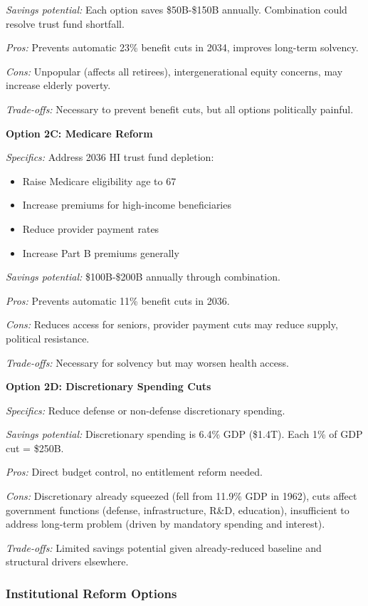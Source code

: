 \documentclass[12pt,letterpaper]{article}
\begin{document}
\textit{Savings potential:} Each option saves \$50B-\$150B annually. Combination could resolve trust fund shortfall.

\textit{Pros:} Prevents automatic 23\% benefit cuts in 2034, improves long-term solvency.

\textit{Cons:} Unpopular (affects all retirees), intergenerational equity concerns, may increase elderly poverty.

\textit{Trade-offs:} Necessary to prevent benefit cuts, but all options politically painful.

\textbf{Option 2C: Medicare Reform}

\textit{Specifics:} Address 2036 HI trust fund depletion:
\begin{itemize}
    \item Raise Medicare eligibility age to 67
    \item Increase premiums for high-income beneficiaries
    \item Reduce provider payment rates
    \item Increase Part B premiums generally
\end{itemize}

\textit{Savings potential:} \$100B-\$200B annually through combination.

\textit{Pros:} Prevents automatic 11\% benefit cuts in 2036.

\textit{Cons:} Reduces access for seniors, provider payment cuts may reduce supply, political resistance.

\textit{Trade-offs:} Necessary for solvency but may worsen health access.

\textbf{Option 2D: Discretionary Spending Cuts}

\textit{Specifics:} Reduce defense or non-defense discretionary spending.

\textit{Savings potential:} Discretionary spending is 6.4\% GDP (\$1.4T). Each 1\% of GDP cut = \$250B.

\textit{Pros:} Direct budget control, no entitlement reform needed.

\textit{Cons:} Discretionary already squeezed (fell from 11.9\% GDP in 1962), cuts affect government functions (defense, infrastructure, R\&D, education), insufficient to address long-term problem (driven by mandatory spending and interest).

\textit{Trade-offs:} Limited savings potential given already-reduced baseline and structural drivers elsewhere.

\subsubsection{Institutional Reform Options}
\end{document}
